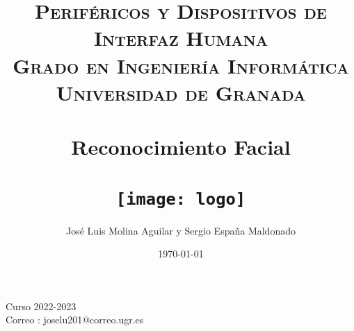 
\usepackage{listings}

\everymath{\displaystyle}

\title{	
\normalfont \normalsize 
\textsc{\textbf{Periféricos y Dispositivos de Interfaz Humana} \\ Grado en Ingeniería Informática \\ Universidad de Granada} \\ [25pt] %
\horrule{0.5pt} \\[0.4cm] %
\huge Reconocimiento Facial  \\ %
\horrule{2pt} \\[0.5cm] %
\texttt{[image: logo]}\\[8ex]
}




\author{José Luis Molina Aguilar y Sergio España Maldonado} %

\date{\normalsize\today} %






\maketitle %
  \begin{large}
    \centering
  \vfill
  
  Curso 2022-2023\\
  Correo : joselu201@correo.ugr.es
  \vfill
  \end{large}
\newpage %

\tableofcontents %



\newpage



\newpage
